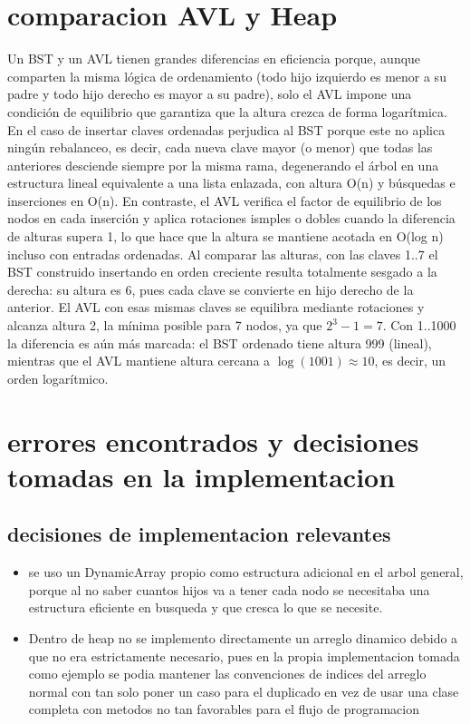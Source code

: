 \documentclass[conference,onecolumn]{IEEEtran}
\begin{document}
\section{comparacion AVL y Heap}
Un BST y un AVL tienen grandes diferencias en eficiencia porque, aunque comparten la misma lógica de ordenamiento (todo hijo izquierdo es menor a su padre y todo hijo derecho es mayor a su padre), solo el AVL impone una condición de equilibrio que garantiza que la altura crezca de forma logarítmica.
En el caso de insertar claves ordenadas perjudica al BST porque este no aplica ningún rebalanceo, es decir, cada nueva clave mayor (o menor) que todas las anteriores desciende siempre por la misma rama, degenerando el árbol en una estructura lineal equivalente a una lista enlazada, con altura O(n) y búsquedas e inserciones en O(n). En contraste, el AVL verifica el factor de equilibrio de los nodos en cada inserción y aplica rotaciones ismples o dobles cuando la diferencia de alturas supera 1, lo que hace que la altura se mantiene acotada en O(log n) incluso con entradas ordenadas.
Al comparar las alturas, con las claves 1..7 el BST construido insertando en orden creciente resulta totalmente sesgado a la derecha: su altura es 6, pues cada clave se convierte en hijo derecho de la anterior. El AVL con esas mismas claves se equilibra mediante rotaciones y alcanza altura 2, la mínima posible para 7 nodos, ya que $2^3 - 1 = 7$. Con 1..1000 la diferencia es aún más marcada: el BST ordenado tiene altura 999 (lineal), mientras que el AVL mantiene altura cercana a $\log(1001) \approx 10$, es decir, un orden logarítmico.
\section{errores encontrados y decisiones tomadas en la implementacion}
\subsection{decisiones de implementacion relevantes}
\begin{itemize}
    \item se uso un DynamicArray propio como estructura adicional en el arbol general, porque al no saber cuantos hijos va a tener cada nodo se necesitaba una estructura eficiente en busqueda y que cresca lo que se necesite.
    \item Dentro de heap no se implemento directamente un arreglo dinamico debido a que no era estrictamente necesario, pues en la propia implementacion tomada como ejemplo se podia mantener las convenciones de indices del arreglo normal con tan solo poner un caso para el duplicado en vez de usar una clase completa con metodos no tan favorables para el flujo de programacion

\end{itemize}
\end{document}
